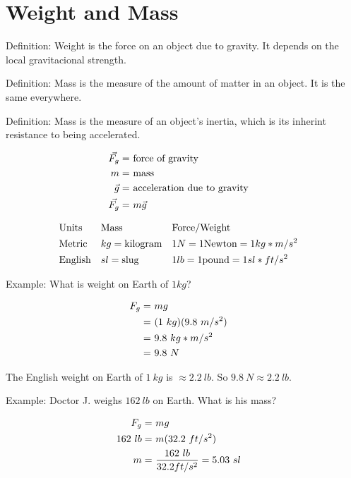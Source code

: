 \section{Weight and Mass}
	Definition: Weight is the force on an object due to gravity. It depends on the local gravitacional strength.

	Definition: Mass is the measure of the amount of matter in an object. It is the same everywhere.

	Definition: Mass is the measure of an object's inertia, which is its inherint resistance to being accelerated.

	\begin{align}
		\vec{F_{g}} = \ &\text{force of gravity}& \notag \\
		m = \ &\text{mass}& \notag \\
		\vec{g} = \ &\text{acceleration due to gravity}& \notag \\
		\vec{F_{g}} = \ &m\vec{g}& \notag
	\end{align}

	\begin{align}
		&\text{Units}& &\text{Mass}& &\text{Force/Weight}& \notag \\
		&\text{Metric}& &kg = \text{kilogram}& &1 N = 1 \text{Newton} = 1 kg*m/s^{2}& \notag \\
		&\text{English}& &sl = \text{slug}& &1 lb = 1 \text{pound} = 1 sl*ft/s^{2}& \notag
	\end{align}

	Example: What is weight on Earth of $1 kg$?

	\begin{align}
		F_{g} = \ &mg& \notag \\
		= \ &(1 \ kg)(9.8 \ m/s^{2})& \notag \\
		= \ &9.8 \ kg*m/s^{2}& \notag \\
		= \ &9.8 \ N& \notag
	\end{align}

	The English weight on Earth of $1 \ kg$ is $\approx 2.2 \ lb$. So $9.8 \ N \approx 2.2 \ lb$.

	Example: Doctor J. weighs $162 \ lb$ on Earth. What is his mass?

	\begin{align}
		F_{g} = \ &mg& \notag \\
		162 \ lb = \ &m(32.2 \ ft/s^{2})& \notag \\
		m = \ &\frac{162 \ lb}{32.2 ft/s^{2}} = 5.03 \ sl& \notag
	\end{align}

